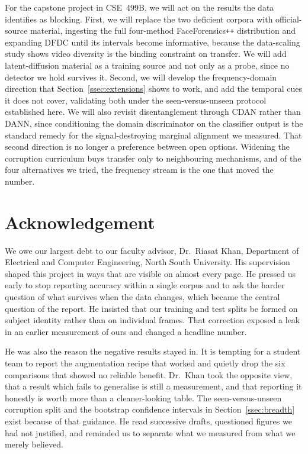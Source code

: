 \documentclass[journal,onecolumn]{IEEEtran}
\newcommand{\dfdc}{DFDC}
\begin{document}
For the capstone project in CSE~499B, we will act on the results the data
identifies as blocking. First, we will replace the two deficient corpora with
official-source material, ingesting the full four-method FaceForensics\texttt{++}
distribution and expanding \dfdc{} until its intervals become informative,
because the data-scaling study shows video diversity is the binding constraint on
transfer. We will add latent-diffusion material as a training source and not only
as a probe, since no detector we hold survives it. Second, we will develop the
frequency-domain direction that Section~\ref{ssec:extensions} shows to work,
and add the temporal cues it does not cover, validating both under the
seen-versus-unseen protocol established here. We will also revisit
disentanglement through CDAN rather than DANN, since conditioning the domain
discriminator on the classifier output is the standard remedy for the
signal-destroying marginal alignment we measured. That second direction is no longer
a preference between open options. Widening the corruption curriculum buys
transfer only to neighbouring mechanisms, and of the four alternatives we tried,
the frequency stream is the one that moved the number.

\section*{Acknowledgement}

We owe our largest debt to our faculty advisor, Dr.~Riasat Khan, Department of
Electrical and Computer Engineering, North South University. His supervision
shaped this project in ways that are visible on almost every page. He pressed us
early to stop reporting accuracy within a single corpus and to ask the harder
question of what survives when the data changes, which became the central
question of the report. He insisted that our training and test splits be formed
on subject identity rather than on individual frames. That correction exposed a
leak in an earlier measurement of ours and changed a headline number.

He was also the reason the negative results stayed in. It is tempting for a
student team to report the augmentation recipe that worked and quietly drop the
six comparisons that showed no reliable benefit. Dr.~Khan took the opposite
view, that a result which fails to generalise is still a measurement, and that
reporting it honestly is worth more than a cleaner-looking table. The
seen-versus-unseen corruption split and the bootstrap confidence intervals in
Section~\ref{ssec:breadth} exist because of that guidance. He read successive
drafts, questioned figures we had not justified, and reminded us to separate
what we measured from what we merely believed.
\end{document}
